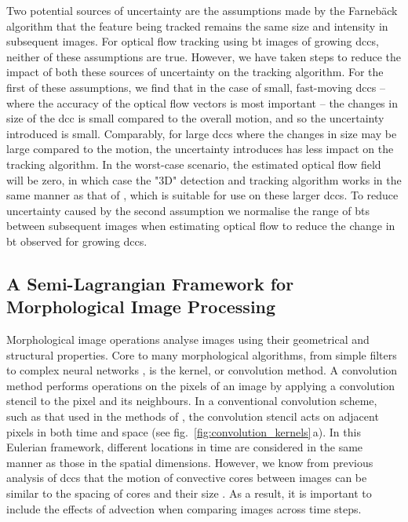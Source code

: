 Two potential sources of uncertainty are the assumptions made by the Farnebäck algorithm that the feature being tracked remains the same size and intensity in subsequent images.
For optical flow tracking using \acrshort{bt} images of growing \acrshort{dcc}s, neither of these assumptions are true.
However, we have taken steps to reduce the impact of both these sources of uncertainty on the tracking algorithm.
For the first of these assumptions, we find that in the case of small, fast-moving \acrshort{dcc}s -- where the accuracy of the optical flow vectors is most important -- the changes in size of the \acrshort{dcc} is small compared to the overall motion, and so the uncertainty introduced is small.
Comparably, for large \acrshort{dcc}s where the changes in size may be large compared to the motion, the uncertainty introduces has less impact on the tracking algorithm.
In the worst-case scenario, the estimated optical flow field will be zero, in which case the "3D" detection and tracking algorithm works in the same manner as that of \citet{fiolleau_algorithm_2013}, which is suitable for use on these larger \acrshort{dcc}s.
To reduce uncertainty caused by the second assumption we normalise the range of \acrshort{bt}s between subsequent images when estimating optical flow to reduce the change in \acrshort{bt} observed for growing \acrshort{dcc}s.

\subsection{A Semi-Lagrangian Framework for Morphological Image Processing}

Morphological image operations analyse images using their geometrical and structural properties.
Core to many morphological algorithms, from simple filters to complex neural networks \citep{kalchbrenner_convolutional_2014}, is the kernel, or convolution method.
A convolution method performs operations on the pixels of an image by applying a convolution stencil to the pixel and its neighbours.
In a conventional convolution scheme, such as that used in the methods of \citet{fiolleau_algorithm_2013}, the convolution stencil acts on adjacent pixels in both time and space (see fig.~\ref{fig:convolution_kernels}\,a).
In this Eulerian framework, different locations in time are considered in the same manner as those in the spatial dimensions.
However, we know from previous analysis of \acrshort{dcc}s that the motion of convective cores between images can be similar to the spacing of cores and their size \citep{heikenfeld_tobac_2019}.
As a result, it is important to include the effects of advection when comparing images across time steps.


